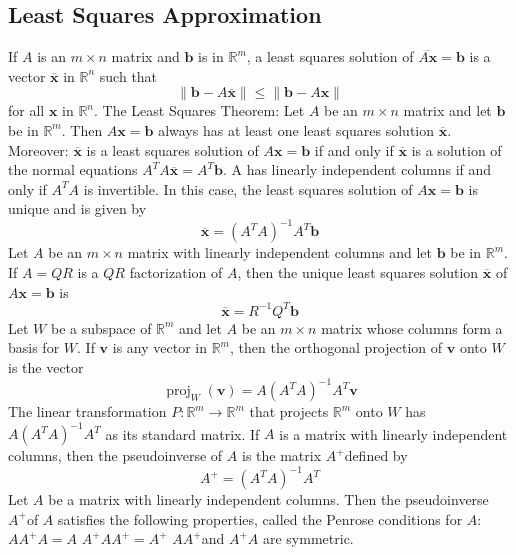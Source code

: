 \documentclass{article}
\begin{document}
    \subsection{Least Squares Approximation} 
    \begin{outline}
        \1 If $A$ is an $m \times n$ matrix and $\mathbf{b}$ is in $\mathbb{R}^{m}$, a least squares solution of $\overline{A \mathbf{x}}=\mathbf{b}$ is a vector $\overline{\mathbf{x}}$ in $\mathbb{R}^{n}$ such that \[\|\mathbf{b}-A \overline{\mathbf{x}}\| \leq\|\mathbf{b}-A \mathbf{x}\|\] for all $\mathbf{x}$ in $\mathbb{R}^{n}$.
        \1 The Least Squares Theorem: Let $A$ be an $m \times n$ matrix and let $\mathbf{b}$ be in $\mathbb{R}^{m}$. Then $A \mathbf{x}=\mathbf{b}$ always has at least one least squares solution $\overline{\mathbf{x}}$. Moreover:
            \2 $\overline{\mathbf{x}}$ is a least squares solution of $A \mathbf{x}=\mathbf{b}$ if and only if $\overline{\mathbf{x}}$ is a solution of the normal equations $A^{T} A \overline{\mathbf{x}}=A^{T} \mathbf{b}$.
            \2 A has linearly independent columns if and only if $A^{T} A$ is invertible. In this case, the least squares solution of $A \mathbf{x}=\mathbf{b}$ is unique and is given by
            \[\overline{\mathbf{x}}=\left(A^{T} A\right)^{-1} A^{T} \mathbf{b}\]
        \1 Let $A$ be an $m \times n$ matrix with linearly independent columns and let $\mathbf{b}$ be in $\mathbb{R}^{m}$. If $A=Q R$ is a $Q R$ factorization of $A$, then the unique least squares solution $\overline{\mathbf{x}}$ of $A \mathbf{x}=\mathbf{b}$ is
        \[\overline{\mathbf{x}}=R^{-1} Q^{T} \mathbf{b}\]
        \1 Let $W$ be a subspace of $\mathbb{R}^{m}$ and let $A$ be an $m \times n$ matrix whose columns form a basis for $W$. If $\mathbf{v}$ is any vector in $\mathbb{R}^{m}$, then the orthogonal projection of $\mathbf{v}$ onto $W$ is the vector
        \[\operatorname{proj}_{W}(\mathbf{v})=A\left(A^{T} A\right)^{-1} A^{T} \mathbf{v}\]
        The linear transformation $P: \mathbb{R}^{m} \rightarrow \mathbb{R}^{m}$ that projects $\mathbb{R}^{m}$ onto $W$ has $A\left(A^{T} A\right)^{-1} A^{T}$ as its standard matrix.
        \1 If $A$ is a matrix with linearly independent columns, then the pseudoinverse of $A$ is the matrix $A^{+}$defined by
        \[A^{+}=\left(A^{T} A\right)^{-1} A^{T}\]
        \1 Let $A$ be a matrix with linearly independent columns. Then the pseudoinverse $A^{+}$of $A$ satisfies the following properties, called the Penrose conditions for $A$:
            \2 $A A^{+} A=A$
            \2 $A^{+} A A^{+}=A^{+}$
            \2 $A A^{+}$and $A^{+} A$ are symmetric.
    \end{outline}
\end{document}
